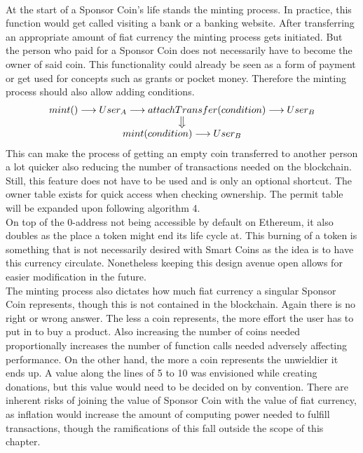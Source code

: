 \\
At the start of a Sponsor Coin's life stands the minting process. In practice, this function would get called visiting a bank or a banking website. After transferring an appropriate amount of fiat currency the minting process gets initiated. But the person who paid for a Sponsor Coin does not necessarily have to become the owner of said coin. This functionality could already be seen as a form of payment or get used for concepts such as grants or pocket money. Therefore the minting process should also allow adding conditions.\\
\begin{equation*}
\begin{array}{c}
    mint() \longrightarrow \emph{$User_A$} \longrightarrow attachTransfer(condition) \longrightarrow \emph{$User_B$} \\
    \big\Downarrow \\
    mint(condition) \longrightarrow \emph{$User_B$}
\end{array}
\end{equation*}
This can make the process of getting an empty coin transferred to another person a lot quicker also reducing the number of transactions needed on the blockchain. Still, this feature does not have to be used and is only an optional shortcut. The owner table exists for quick access when checking ownership. The permit table will be expanded upon following algorithm 4.\\
On top of the 0-address not being accessible by default on Ethereum, it also doubles as the place a token might end its life cycle at. This burning of a token is something that is not necessarily desired with Smart Coins as the idea is to have this currency circulate. Nonetheless keeping this design avenue open allows for easier modification in the future.\\
The minting process also dictates how much fiat currency a singular Sponsor Coin represents, though this is not contained in the blockchain. Again there is no right or wrong answer. The less a coin represents, the more effort the user has to put in to buy a product. Also increasing the number of coins needed proportionally increases the number of function calls needed adversely affecting performance. On the other hand, the more a coin represents the unwieldier it ends up. A value along the lines of 5\EUR{} to 10\EUR{} was envisioned while creating donations, but this value would need to be decided on by convention. There are inherent risks of joining the value of Sponsor Coin with the value of fiat currency, as inflation would increase the amount of computing power needed to fulfill transactions, though the ramifications of this fall outside the scope of this chapter.\\
